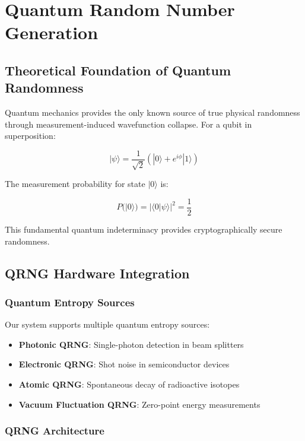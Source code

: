 \documentclass[11pt,a4paper]{article}
\newcommand{\qket}[1]{|#1\rangle}
\newcommand{\qbraket}[2]{\langle#1|#2\rangle}
\begin{document}
\section{Quantum Random Number Generation}

\subsection{Theoretical Foundation of Quantum Randomness}

Quantum mechanics provides the only known source of true physical randomness through measurement-induced wavefunction collapse. For a qubit in superposition:

\begin{equation}
\qket{\psi} = \frac{1}{\sqrt{2}}(\qket{0} + e^{i\phi}\qket{1})
\end{equation}

The measurement probability for state $\qket{0}$ is:

\begin{equation}
P(\qket{0}) = |\qbraket{0}{\psi}|^2 = \frac{1}{2}
\end{equation}

This fundamental quantum indeterminacy provides cryptographically secure randomness.

\subsection{QRNG Hardware Integration}

\subsubsection{Quantum Entropy Sources}

Our system supports multiple quantum entropy sources:

\begin{itemize}
    \item \textbf{Photonic QRNG}: Single-photon detection in beam splitters
    \item \textbf{Electronic QRNG}: Shot noise in semiconductor devices
    \item \textbf{Atomic QRNG}: Spontaneous decay of radioactive isotopes
    \item \textbf{Vacuum Fluctuation QRNG}: Zero-point energy measurements
\end{itemize}

\subsubsection{QRNG Architecture}
\end{document}
